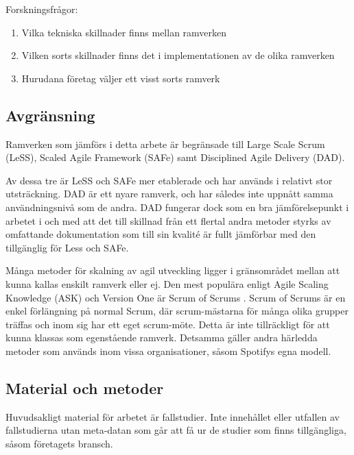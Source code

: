 		
		Forskningsfrågor:
		\begin{enumerate}
			\item Vilka tekniska skillnader finns mellan ramverken
			\item Vilken sorts skillnader finns det i implementationen av de olika ramverken
			\item Hurudana företag väljer ett visst sorts ramverk
			
		\end{enumerate}
			
	
	\subsection{Avgränsning}
	
		Ramverken som jämförs i detta arbete är begränsade till Large Scale Scrum (LeSS), Scaled Agile Framework (SAFe) samt Disciplined Agile Delivery (DAD).
		
		Av dessa tre är LeSS och SAFe mer etablerade och har används i relativt stor utsträckning. DAD är ett nyare ramverk, och har således inte uppnått samma användningsnivå som de andra. DAD fungerar dock som en bra jämförelsepunkt i arbetet i och med att det till skillnad från ett flertal andra metoder styrks av omfattande dokumentation som till sin kvalité är fullt jämförbar med den tillgänglig för Less och SAFe.
		\cite{ask_matrix}
		
		Många metoder för skalning av agil utveckling ligger i gränsområdet mellan att kunna kallas enskilt ramverk eller ej. Den mest populära enligt Agile Scaling Knowledge (ASK) och Version One är Scrum of Scrums \cite{ask_matrix} \cite{version_one_report}. Scrum of Scrums är en enkel förlängning på normal Scrum, där scrum-mästarna för många olika grupper träffas och inom sig har ett eget scrum-möte. Detta är inte tillräckligt för att kunna klassas som egenstående ramverk. Detsamma gäller andra härledda metoder som används inom vissa organisationer, såsom Spotifys egna modell.
		
	\subsection{Material och metoder}
		
		Huvudsakligt material för arbetet är fallstudier. Inte innehållet eller utfallen av fallstudierna utan meta-datan som går att få ur de studier som finns tillgängliga, såsom företagets bransch.
				
